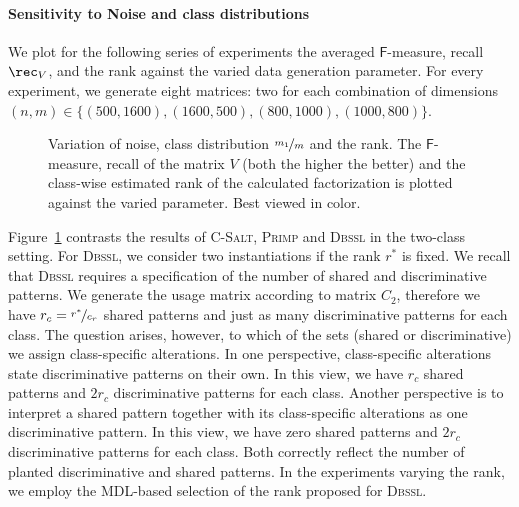 \paragraph{Sensitivity to Noise and class distributions}
We plot for the following series of experiments the averaged $\mathsf{F}$-measure, recall $\rec_V$, and the rank against the varied data generation parameter. For every experiment, we generate eight matrices: two for each combination of dimensions $(n,m)\in\{(500,1600),\allowbreak(1600,500),\allowbreak(800,1000),\allowbreak(1000,800)\}$.
\begin{figure}[t!]
\centering

\caption{Variation of noise, class distribution $\nicefrac{m_1}{m}$  and the rank. The $\mathsf{F}$-measure, recall of the matrix $V$ (both the higher the better) and the class-wise estimated rank of the calculated factorization is plotted against the varied parameter. Best viewed in color.}
\label{fig:noise}
\end{figure}

Figure~\ref{fig:noise} contrasts the results of \textsc{C-Salt}, \textsc{Primp} and \textsc{Dbssl} in the two-class setting. For \textsc{Dbssl}, we consider two instantiations if the rank $r^*$ is fixed. We recall that \textsc{Dbssl} requires a specification of the number of shared and discriminative patterns. We generate the usage matrix according to matrix $C_2$, therefore we have $r_c=\nicefrac{r^*}{c_r}$ shared patterns and just as many discriminative patterns for each class. The question arises, however, to which of the sets (shared or discriminative) we assign class-specific alterations. In one perspective, class-specific alterations state discriminative patterns on their own. In this view, we have $r_c$ shared patterns and $2r_c$ discriminative patterns for each class. Another perspective is to interpret a shared pattern together with its class-specific alterations as one discriminative pattern. In this view, we have zero shared patterns and $2r_c$ discriminative patterns for each class. Both correctly reflect the number of planted discriminative and shared patterns. In the experiments varying the rank, we employ the MDL-based selection of the rank proposed for \textsc{Dbssl}. %


